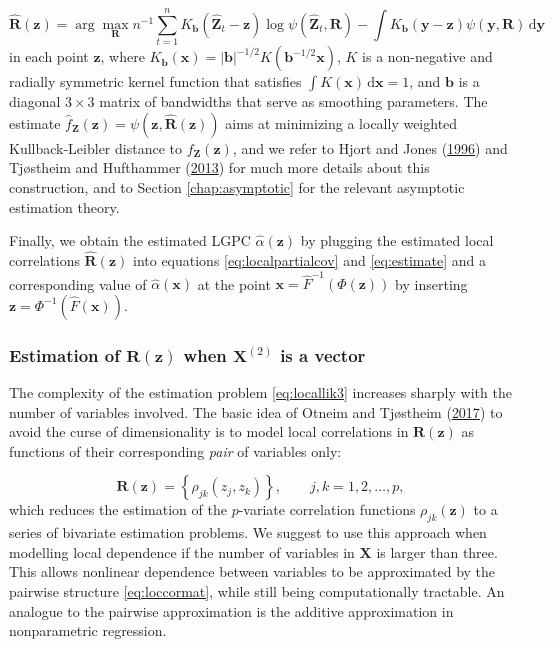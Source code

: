 \documentclass[
  12pt,
  letterpaper]{article}
\newcommand{\X}{\bm{X}}
\newcommand{\Xtwo}{\bm{X}^{(2)}}
\newcommand{\x}{\bm{x}}
\newcommand{\Z}{\bm{Z}}
\newcommand{\z}{\bm{z}}
\newcommand{\hZ}{\widehat{\bm{Z}}}
\newcommand{\y}{\bm{y}}
\newcommand{\R}{\bm{R}}
\newcommand{\hR}{\widehat{\bm{R}}}
\newcommand{\hf}{\widehat{f}}
\newcommand{\hh}{\bm{b}}
\newcommand{\halpha}{\widehat{\alpha}}
\theoremstyle{definition}
\theoremstyle{definition}
\theoremstyle{definition}
\theoremstyle{remark}
\begin{document}
\begin{equation}
\hR(\z) = \arg\max_{\R} n^{-1} \sum_{t=1}^nK_{\hh}(\hZ_t - \z)\log\psi(\hZ_t, \R) - \int K_{\hh}(\y - \z)\psi(\y, \R)\,\textrm{d}\y
\label{eq:locallik3}
\end{equation}
in each point \(\z\), where \(K_{\hh}(\x) = |\hh|^{-1/2}K(\hh^{-1/2}\x)\), \(K\) is a non-negative and radially symmetric kernel function that satisfies \(\int K(\x)\,\textrm{d}\x=1\), and \(\hh\) is a diagonal \(3\times3\) matrix of bandwidths that serve as smoothing parameters. The estimate \(\hf_{\Z}(\z) = \psi(\z, \hR(\z))\) aims at minimizing a locally weighted Kullback-Leibler distance to \(f_{\Z}(\z)\), and we refer to Hjort and Jones (\protect\hyperlink{ref-hjort1996locally}{1996}) and Tjøstheim and Hufthammer (\protect\hyperlink{ref-tjostheim2013local}{2013}) for much more details about this construction, and to Section \ref{chap:asymptotic} for the relevant asymptotic estimation theory.

Finally, we obtain the estimated LGPC \(\halpha(\z)\) by plugging the estimated local correlations \(\hR(\z)\) into equations \eqref{eq:localpartialcov} and \eqref{eq:estimate} and a corresponding value of \(\halpha(\x)\) at the point \(\x = \widehat F^{-1}(\Phi(\z))\) by inserting \(\z = \Phi^{-1}({\widehat F(\x)})\).

\hypertarget{chap:bivariate}{%
\subsubsection{\texorpdfstring{Estimation of \(\R(\z)\) when \(\Xtwo\) is a vector}{Estimation of \textbackslash R(\textbackslash z) when \textbackslash Xtwo is a vector}}\label{chap:bivariate}}

The complexity of the estimation problem \eqref{eq:locallik3} increases sharply with the number of variables involved. The basic idea of Otneim and Tjøstheim (\protect\hyperlink{ref-otneim2017locally}{2017}) to avoid the curse of dimensionality is to model local correlations in \(\R(\z)\) as functions of their corresponding \emph{pair} of variables only:

\begin{equation}
\R(\z) = \left\{\rho_{jk}(z_j, z_k)\right\}, \qquad j,k = 1, 2, \ldots, p,
\label{eq:loccormat}
\end{equation}
which reduces the estimation of the \(p\)-variate correlation functions \(\rho_{jk}(\z)\) to a series of bivariate estimation problems. We suggest to use this approach when modelling local dependence if the number of variables in \(\X\) is larger than three. This allows nonlinear dependence between variables to be approximated by the pairwise structure \eqref{eq:loccormat}, while still being computationally tractable. An analogue to the pairwise approximation is the additive approximation in nonparametric regression.
\end{document}
